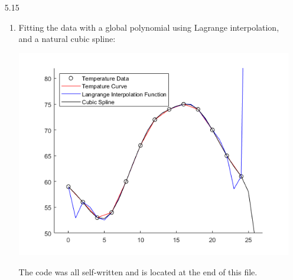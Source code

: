 \documentclass[11pt,a4paper]{article}
\begin{document}
\begin{itemize}
			\item[5.15]
				\begin{enumerate} [label={\alph*)}]
					\item Fitting the data with a global polynomial using Lagrange interpolation, and a natural cubic spline:
					\begin{center}
						\includegraphics[width=1\linewidth]{ch5q15}
					\end{center}
				The code was all self-written and is located at the end of this file.\\
				

\end{enumerate}
\end{itemize}
\end{document}
